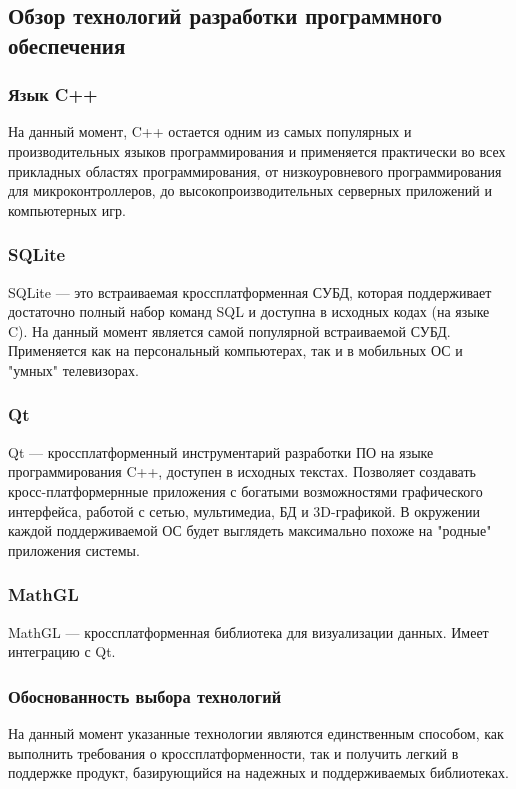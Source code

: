 \subsection{Обзор технологий разработки программного обеспечения}

\subsubsection{Язык C++}
На данный момент, C++ остается одним из самых популярных и производительных языков программирования и применяется практически во всех прикладных областях
программирования, от низкоуровневого программирования для микроконтроллеров, до высокопроизводительных серверных приложений и компьютерных игр.

\subsubsection{SQLite}
SQLite — это встраиваемая кроссплатформенная СУБД, которая поддерживает достаточно полный набор команд SQL и доступна в исходных кодах (на языке C). На данный
момент является самой популярной встраиваемой СУБД. Применяется как на персональный компьютерах, так и в мобильных ОС и "умных" телевизорах.

\subsubsection{Qt}
Qt — кроссплатформенный инструментарий разработки ПО на языке программирования C++, доступен в исходных текстах. Позволяет создавать кросс-платформернные приложения с богатыми возможностями
графического интерфейса, работой с сетью, мультимедиа, БД и 3D-графикой. В окружении каждой поддерживаемой ОС будет выглядеть максимально похоже на "родные" приложения
системы.

\subsubsection{MathGL}
MathGL — кроссплатформенная библиотека для визуализации данных. Имеет интеграцию с Qt.

\subsubsection{Обоснованность выбора технологий}
На данный момент указанные технологии являются единственным способом, как выполнить требования о кроссплатформенности, так и получить легкий в поддержке
продукт, базирующийся на надежных и поддерживаемых библиотеках.

